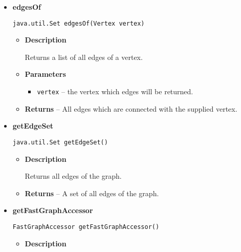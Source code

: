 {{{{{{{\begin{itemize}
{\begin{itemize}
{Adds the graph to a \texttt{\small FastGraphAccessor}{\small 
{}}.
}
\item{
{\bf  Parameters}
  \begin{itemize}
   \item{
\texttt{fga} -- the \texttt{\small FastGraphAccessor}{\small 
{}} to whom this graph will be added.}
  \end{itemize}
}%
\end{itemize}
}%
\item{ 
{\bf  edgesOf}\\
\begin{lstlisting}[frame=none]
java.util.Set edgesOf(Vertex vertex)\end{lstlisting} %
\begin{itemize}
\item{
{\bf  Description}

Returns a list of all edges of a vertex.
}
\item{
{\bf  Parameters}
  \begin{itemize}
   \item{
\texttt{vertex} -- the vertex which edges will be returned.}
  \end{itemize}
}%
\item{{\bf  Returns} -- 
All edges which are connected with the supplied vertex. 
}%
\end{itemize}
}%
\item{ 
{\bf  getEdgeSet}\\
\begin{lstlisting}[frame=none]
java.util.Set getEdgeSet()\end{lstlisting} %
\begin{itemize}
\item{
{\bf  Description}

Returns all edges of the graph.
}
\item{{\bf  Returns} -- 
A set of all edges of the graph. 
}%
\end{itemize}
}%
\item{ 
{\bf  getFastGraphAccessor}\\
\begin{lstlisting}[frame=none]
FastGraphAccessor getFastGraphAccessor()\end{lstlisting} %
\begin{itemize}
\item{
{\bf  Description}

}
\end{itemize}}
\end{itemize}}}}}}}}
